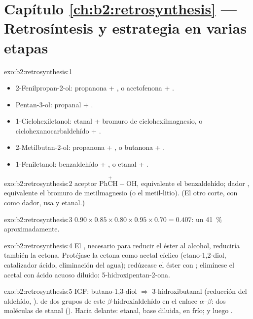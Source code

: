 \section*{Capítulo \ref{ch:b2:retrosynthesis} --- Retrosíntesis y estrategia en varias etapas}

\begin{solution}{exo:b2:retrosynthesis:1}
\begin{itemize}
  \item 2-Fenilpropan-2-ol: propanona + , o acetofenona + .
  \item Pentan-3-ol: propanal + .
  \item 1-Ciclohexiletanol: etanal + bromuro de ciclohexilmagnesio, o ciclohexanocarbaldehído +
        .
  \item 2-Metilbutan-2-ol: propanona + , o butanona + .
  \item 1-Feniletanol: benzaldehído + , o etanal + .
\end{itemize}
\end{solution}

\begin{solution}{exo:b2:retrosynthesis:2}
 aceptor $\mathrm{Ph\overset{+}{C}H{-}OH}$, equivalente el benzaldehído;  dador ,
equivalente el bromuro de metilmagnesio (o el metil-litio). (El otro corte, con  como dador, usa
 y etanal.)
\end{solution}

\begin{solution}{exo:b2:retrosynthesis:3}
$0.90 \times 0.85 \times 0.80 \times 0.95 \times 0.70 = 0.407$: un 41~\% aproximadamente.
\end{solution}

\begin{solution}{exo:b2:retrosynthesis:4}
El , necesario para reducir el éster al alcohol, reduciría también la cetona. Protéjase la
cetona como acetal cíclico (etano-1,2-diol, catalizador ácido, eliminación del agua); redúzcase el éster con
; elimínese el acetal con ácido acuoso diluido: 5-hidroxipentan-2-ona.
\end{solution}

\begin{solution}{exo:b2:retrosynthesis:5}
IGF: butano-1,3-diol $\Rightarrow$ 3-hidroxibutanal (reducción del aldehído, ).  de dos grupos
de este $\beta$-hidroxialdehído en el enlace $\alpha$--$\beta$: dos moléculas de etanal
(). Hacia delante: etanal, base diluida, en frío; y luego .
\end{solution}

